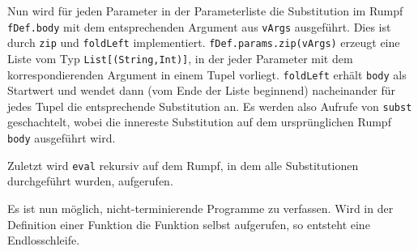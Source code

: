 \documentclass[]{article}
\begin{document}
Nun wird für jeden Parameter in der Parameterliste die Substitution im
Rumpf \texttt{fDef.body} mit dem entsprechenden Argument aus
\texttt{vArgs} ausgeführt. Dies ist durch \texttt{zip} und
\texttt{foldLeft} implementiert. \texttt{fDef.params.zip(vArgs)} erzeugt
eine Liste vom Typ \texttt{List{[}(String,Int){]}}, in der jeder
Parameter mit dem korrespondierenden Argument in einem Tupel vorliegt.
\texttt{foldLeft} erhält \texttt{body} als Startwert und wendet dann
(vom Ende der Liste beginnend) nacheinander für jedes Tupel die
entsprechende Substitution an. Es werden also Aufrufe von \texttt{subst}
geschachtelt, wobei die innereste Substitution auf dem ursprünglichen
Rumpf \texttt{body} ausgeführt wird.

Zuletzt wird \texttt{eval} rekursiv auf dem Rumpf, in dem alle
Substitutionen durchgeführt wurden, aufgerufen.

Es ist nun möglich, nicht-terminierende Programme zu verfassen. Wird in
der Definition einer Funktion die Funktion selbst aufgerufen, so
entsteht eine Endlosschleife.
\end{document}
